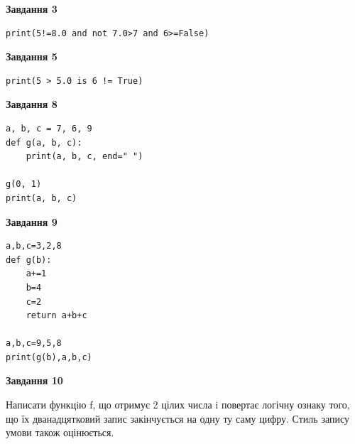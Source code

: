 \documentclass[12pt, ukrainian]{article}
\begin{document}
{\begin {large}
\begin{minipage}[t]{7.5cm}
\end{minipage}
\vline \hspace{6mm}
\begin{minipage}[t]{10.5cm}

\begin{center}
\textbf{Завдання 3}
\end{center}

\begin{verbatim}
print(5!=8.0 and not 7.0>7 and 6>=False)
\end{verbatim}



\begin{center}
\textbf{Завдання 5}
\end{center}

\begin{verbatim}
print(5 > 5.0 is 6 != True)
\end{verbatim}



\begin{center}
\textbf{Завдання 8}
\end{center}

\begin{verbatim}
a, b, c = 7, 6, 9
def g(a, b, c):
    print(a, b, c, end=" ")

g(0, 1)
print(a, b, c)
\end{verbatim}



\begin{center}
\textbf{Завдання 9}
\end{center}

\begin{verbatim}
a,b,c=3,2,8
def g(b):
    a+=1
    b=4
    c=2
    return a+b+c

a,b,c=9,5,8
print(g(b),a,b,c)
\end{verbatim}



\begin{center}
\textbf{Завдання 10}
\end{center}

Написати функцiю f, що отримує 2 цілих числа i повертає логічну ознаку того, що їх дванадцятковий запис закінчується на одну ту саму цифру. Стиль запису умови також оцінюється.\par

\end{minipage}

\end {large}}
\newpage
\end{document}
